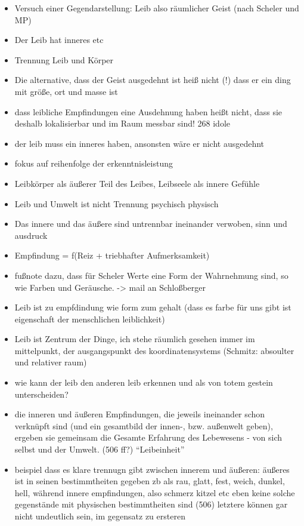 \documentclass[a4paper, 12pt]{article}
\begin{document}
\begin{onehalfspace}
\begin{itemize}
  \item Versuch einer Gegendarstellung: Leib also räumlicher Geist (nach Scheler und MP)
  \item Der Leib hat inneres etc
  \item Trennung Leib und Körper
  \item Die alternative, dass der Geist ausgedehnt ist heiß nicht (!) dass er ein ding mit größe, ort und masse ist
  \item dass leibliche Empfindungen eine Ausdehnung haben heißt nicht, dass sie deshalb lokalisierbar und im Raum messbar sind! 268 idole
  \item der leib muss ein inneres haben, ansonsten wäre er nicht ausgedehnt
  \item fokus auf reihenfolge der erkenntnisleistung
  \item Leibkörper als äußerer Teil des Leibes, Leibseele als innere Gefühle
  \item Leib und Umwelt ist nicht Trennung psychisch physisch
  \item Das innere und das äußere sind untrennbar ineinander verwoben, sinn und ausdruck 
  \item Empfindung = f(Reiz + triebhafter Aufmerksamkeit)
  \item fußnote dazu, dass für Scheler Werte eine Form der Wahrnehmung sind, so wie Farben und Geräusche. -> mail an Schloßberger
  \item Leib ist zu empfdindung wie form zum gehalt (dass es farbe für uns gibt ist eigenschaft der menschlichen leiblichkeit)
  \item Leib ist Zentrum der Dinge, ich stehe räumlich gesehen immer im mittelpunkt, der ausgangspunkt des koordinatensystems (Schmitz: absoulter und relativer raum)
  \item wie kann der leib den anderen leib erkennen und als von totem gestein unterscheiden?
  \item die inneren und äußeren Empfindungen, die jeweils ineinander schon verknüpft sind (und ein gesamtbild der innen-, bzw. außenwelt geben), ergeben sie gemeinsam die Gesamte Erfahrung des Lebewesens - von sich selbst und der Umwelt. (506 ff?) "`Leibeinheit"'
  \item beispiel dass es klare trennugn gibt zwischen innerem und äußeren: äußeres ist in seinen bestimmtheiten gegeben zb als rau, glatt, fest, weich, dunkel, hell, während innere empfindungen, also schmerz kitzel etc eben keine solche gegenstände mit physischen bestimmtheiten sind (506) letztere können gar nicht undeutlich sein, im gegensatz zu ersteren
\end{itemize}



\end{onehalfspace}
\end{document}

